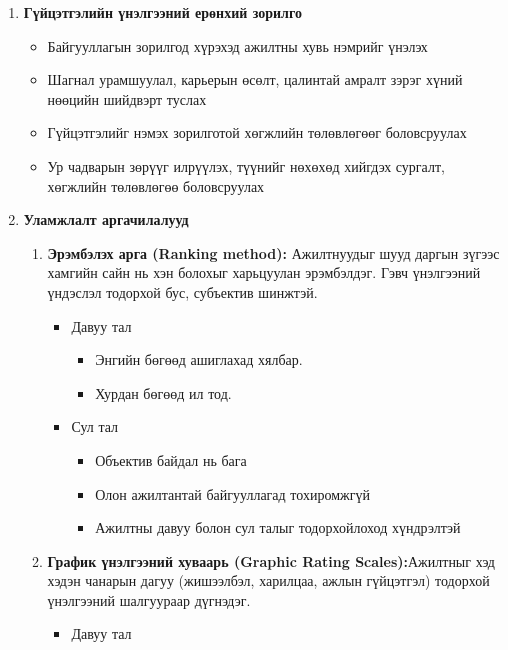 \begin{enumerate}
    \item \textbf{Гүйцэтгэлийн үнэлгээний ерөнхий зорилго}
    \begin{itemize}
        \item Байгууллагын зорилгод хүрэхэд ажилтны хувь нэмрийг үнэлэх
        \item Шагнал урамшуулал, карьерын өсөлт, цалинтай амралт зэрэг хүний нөөцийн шийдвэрт туслах
        \item Гүйцэтгэлийг нэмэх зорилготой хөгжлийн төлөвлөгөөг боловсруулах
        \item Ур чадварын зөрүүг илрүүлэх, түүнийг нөхөхөд хийгдэх сургалт, хөгжлийн төлөвлөгөө боловсруулах
    \end{itemize}
    \item \textbf{Уламжлалт аргачилалууд}
    \begin{enumerate}
        \item \textbf{Эрэмбэлэх арга (Ranking method):}  Ажилтнуудыг шууд даргын зүгээс хамгийн сайн нь хэн болохыг 
        харьцуулан эрэмбэлдэг. Гэвч үнэлгээний үндэслэл тодорхой бус, субъектив шинжтэй.
        \begin{itemize}
            \item Давуу тал
            \begin{itemize}
                \item Энгийн бөгөөд ашиглахад хялбар.
                \item Хурдан бөгөөд ил тод.
            \end{itemize}
            \item Сул тал
            \begin{itemize}
                \item Объектив байдал нь бага 
                \item Олон ажилтантай байгууллагад тохиромжгүй
                \item Ажилтны давуу болон сул талыг тодорхойлоход хүндрэлтэй
            \end{itemize}
        \end{itemize}
        \item \textbf{График үнэлгээний хуваарь (Graphic Rating Scales):}Ажилтныг хэд хэдэн чанарын дагуу 
        (жишээлбэл, харилцаа, ажлын гүйцэтгэл) тодорхой үнэлгээний шалгуураар дүгнэдэг.
        \begin{itemize}
            \item Давуу тал
            \begin{itemize}

\end{itemize}
\end{itemize}
\end{enumerate}
\end{enumerate}
